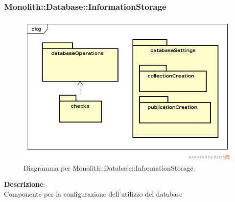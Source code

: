 \subsubsection{Monolith::Database::InformationStorage}
   \FloatBarrier
   \begin{figure}[ht]
   \centering
\includegraphics[width=\textwidth,keepaspectratio]{img/informationStorage}
   \caption{Diagramma per Monolith::Database::InformationStorage.}
\end{figure}
\FloatBarrier
\textbf{Descrizione}:\\
 Componente per la configurazione dell'utilizzo del database 


\clearpage

